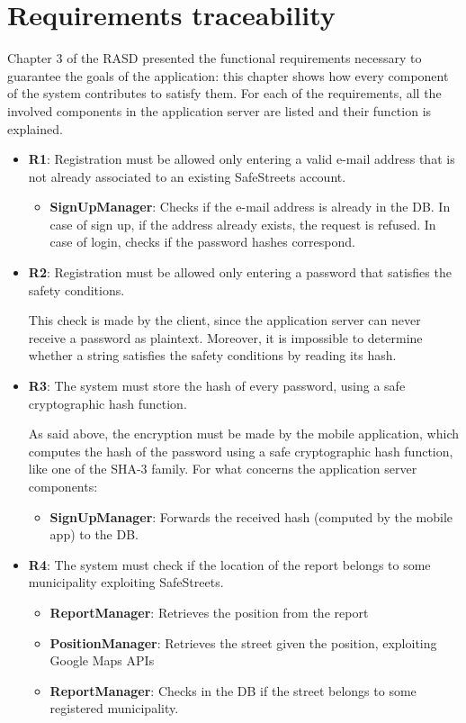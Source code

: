 \documentclass[12pt,a4paper]{report}
\begin{document}
	\chapter{Requirements traceability}
	Chapter 3 of the RASD presented the functional requirements necessary
	to guarantee the goals of the application: this chapter shows how every
	component of the system contributes to satisfy them. For each of the requirements,
	all the involved components in the application server are listed and their function
	is explained.
	\begin{itemize}
	\item\textbf{R1}: Registration must be allowed only entering a valid e-mail address that is not already associated to an existing SafeStreets account.
		\begin{itemize}
		\item\textbf{SignUpManager}: Checks if the e-mail address is already in the DB. In case of sign up, if the address already exists, the request is refused.
		In case of login, checks if the password hashes correspond.
		\end{itemize}
		
	\item\textbf{R2}: Registration must be allowed only entering a password that satisfies the safety conditions.

		This check is made by the client, since the application server can never receive a password as plaintext. Moreover, it is impossible to determine whether
		a string satisfies the safety conditions by reading its hash.
		
	\item\textbf{R3}: The system must store the hash of every password, using a safe cryptographic hash function.

		As said above, the encryption must be made by the mobile application, which computes the hash of the password using a safe cryptographic hash function, like one of the SHA-3 family. For what concerns the application server components:
		\begin{itemize}
		\item\textbf{SignUpManager}: Forwards the received hash (computed by the mobile app) to the DB.
		\end{itemize}
		
	\item\textbf{R4}: The system must check if the location of the report belongs to some municipality exploiting SafeStreets.
		\begin{itemize}
		\item\textbf{ReportManager}: Retrieves the position from the report
		\item\textbf{PositionManager}: Retrieves the street given the position, exploiting Google Maps APIs		
		\item\textbf{ReportManager}: Checks in the DB if the street belongs to some registered municipality.
		\end{itemize}
	

\end{itemize}
\end{document}
